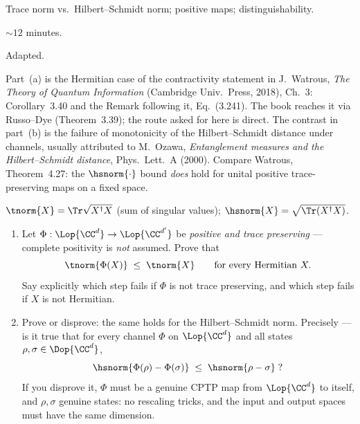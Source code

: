 


\begin{daymeta}
  \item[Topic] Trace norm vs.\ Hilbert--Schmidt norm; positive maps; distinguishability.
  \item[Estimated time] $\sim 12$ minutes.
  \item[Origin] Adapted.
  \item[Source] Part~(a) is the Hermitian case of the contractivity statement in
    J.~Watrous, \emph{The Theory of Quantum Information} (Cambridge Univ.\ Press, 2018),
    Ch.~3: Corollary~3.40 and the Remark following it, Eq.~(3.241). The book reaches it
    via Russo--Dye (Theorem~3.39); the route asked for here is direct.
    The contrast in part~(b) is the failure of monotonicity of the Hilbert--Schmidt
    distance under channels, usually attributed to M.~Ozawa,
    \emph{Entanglement measures and the Hilbert--Schmidt distance},
    Phys.\ Lett.\ A (2000). %
    Compare Watrous, Theorem~4.27: the $\hsnorm{\cdot}$ bound \emph{does} hold for
    unital positive trace-preserving maps on a fixed space.
  \item[Conventions] $\tnorm{X}=\Tr\sqrt{X^{\dagger}X}$ (sum of singular values);
    $\hsnorm{X}=\sqrt{\Tr(X^{\dagger}X)}$.
\end{daymeta}

\begin{problem}
\leavevmode
\begin{enumerate}[label=\textbf{(\alph*)},leftmargin=*]

\item Let $\Phi:\Lop{\CC^{d}}\to\Lop{\CC^{d'}}$ be \emph{positive and trace preserving}
      --- complete positivity is \emph{not} assumed. Prove that
      \[
        \tnorm{\Phi(X)}\;\le\;\tnorm{X}
        \qquad\text{for every Hermitian }X .
      \]
      Say explicitly which step fails if $\Phi$ is not trace preserving, and which step
      fails if $X$ is not Hermitian.

\item Prove or disprove: the same holds for the Hilbert--Schmidt norm. Precisely --- is it
      true that for every channel $\Phi$ on $\Lop{\CC^{d}}$ and all states
      $\rho,\sigma\in\Dop{\CC^{d}}$,
      \[
        \hsnorm{\Phi(\rho)-\Phi(\sigma)}\;\le\;\hsnorm{\rho-\sigma}\;?
      \]
      If you disprove it, $\Phi$ must be a genuine CPTP map from $\Lop{\CC^{d}}$ to itself,
      and $\rho,\sigma$ genuine states: no rescaling tricks, and the input and output spaces
      must have the same dimension.

\end{enumerate}
\end{problem}

